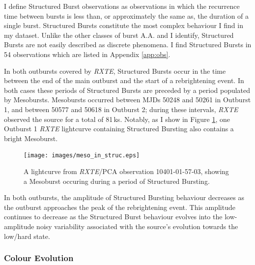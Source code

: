 \par I define Structured Burst observations as observations in which the recurrence time between bursts is less than, or approximately the same as, the duration of a single burst.  Structured Bursts constitute the most complex behaviour I find in my dataset.  Unlike the other classes of burst \textsf{A.A.} and I identify, Structured Bursts are not easily described as discrete phenomena.  I find Structured Bursts in 54 observations which are listed in Appendix \ref{app:obs}.
\par In both outbursts covered by \indexrxte\textit{RXTE}, Structured Bursts occur in the time between the end of the main outburst and the start of a rebrightening event.  In both cases these periods of Structured Bursts are preceded by a period populated by Mesobursts.  Mesobursts occurred between MJDs 50248 and 50261 in Outburst 1, and between 50577 and 50618 in Outburst 2; during these intervals, \textit{RXTE} observed the source for a total of 81\,ks.  Notably, as I show in Figure \ref{fig:meso_in_struc}, one Outburst 1 \textit{RXTE} lightcurve containing Structured Bursting also contains a bright Mesoburst.

\begin{figure}
  \centering
  \texttt{[image: images/meso\_in\_struc.eps]}
  \caption[A lightcurve from \textit{RXTE}/PCA observation 10401-01-57-03, showing a Mesoburst occuring during a period of Structured Bursting.]{\small A lightcurve from \indexpca\textit{RXTE}/PCA observation 10401-01-57-03, showing a Mesoburst occuring during a period of Structured Bursting.}
  \label{fig:meso_in_struc}
\end{figure}

\par In both outbursts, the amplitude of Structured Bursting behaviour decreases as the outburst approaches the peak of the rebrightening event.  This amplitude continues to decrease as the Structured Burst behaviour evolves into the low-amplitude noisy variability associated with the source's evolution towards the low/hard state.

\subsubsection{Colour Evolution}

